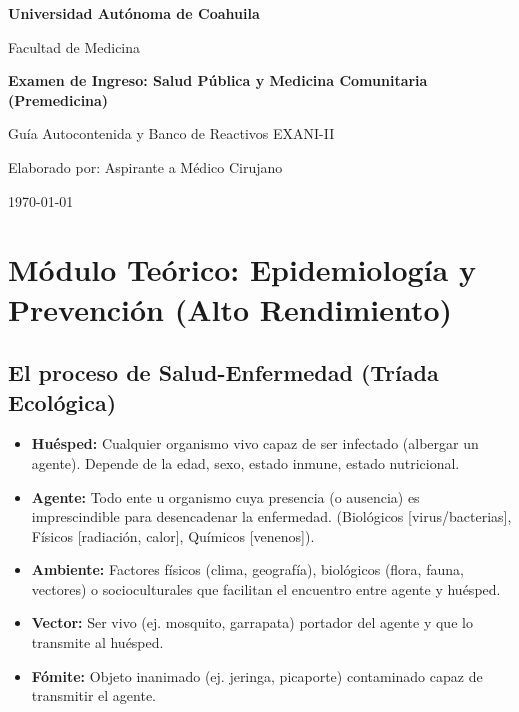 \documentclass[spanish,letterpaper,oneside]{article}
\begin{document}
\begin{titlepage}
    \centering
    \vspace*{2cm}
    {\Huge \textbf{Universidad Autónoma de Coahuila} \par}
    \vspace{1cm}
    {\Large Facultad de Medicina \par}
    \vspace{2cm}
    {\LARGE \textbf{Examen de Ingreso: Salud Pública y Medicina Comunitaria (Premedicina)} \par}
    \vspace{1cm}
    {\Large Guía Autocontenida y Banco de Reactivos EXANI-II \par}
    \vspace{3cm}
    {\large Elaborado por: Aspirante a Médico Cirujano \par}
    \vfill
    {\large \today \par}
\end{titlepage}

\tableofcontents
\newpage

\section{Módulo Teórico: Epidemiología y Prevención (Alto Rendimiento)}
\subsection{El proceso de Salud-Enfermedad (Tríada Ecológica)}
\begin{itemize}
    \item \textbf{Huésped:} Cualquier organismo vivo capaz de ser infectado (albergar un agente). Depende de la edad, sexo, estado inmune, estado nutricional.
    \item \textbf{Agente:} Todo ente u organismo cuya presencia (o ausencia) es imprescindible para desencadenar la enfermedad. (Biológicos [virus/bacterias], Físicos [radiación, calor], Químicos [venenos]).
    \item \textbf{Ambiente:} Factores físicos (clima, geografía), biológicos (flora, fauna, vectores) o socioculturales que facilitan el encuentro entre agente y huésped. 
    \item \textbf{Vector:} Ser vivo (ej. mosquito, garrapata) portador del agente y que lo transmite al huésped.
    \item \textbf{Fómite:} Objeto inanimado (ej. jeringa, picaporte) contaminado capaz de transmitir el agente.
\end{itemize}
\end{document}
